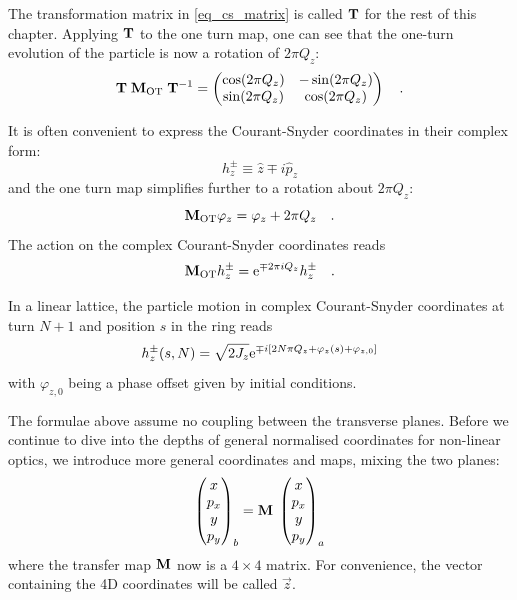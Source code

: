 The transformation matrix in \eqref{eq_cs_matrix} is called $\mathbf{T}$ for the rest of this chapter.
Applying $\mathbf{T}$ to the one turn map, one can see that the one-turn evolution of the particle is
now a rotation of $2\pi Q_z$:
\begin{equation}
    \mathbf{T}\;\mathbf{M}_\text{OT}\;\mathbf{T}^{-1} = 
    \begin{pmatrix}
        \cos(2\pi Q_z) & -\sin(2\pi Q_z)\\
        \sin(2\pi Q_z) & \cos(2\pi Q_z) \\
    \end{pmatrix}
    \quad .
\end{equation}

It is often convenient to express the Courant-Snyder coordinates in their complex form:
%
\begin{equation}
    h^\pm_z \equiv \hat{z} \mp i \hat{p}_z
    \label{eq_courantsnyder}
\end{equation}
%
and the one turn map simplifies further to a rotation about $2\pi Q_z$:
%
\begin{equation}
    \mathbf{M}_\text{OT} \varphi_z = \varphi_z + 2\pi Q_z
    \quad .
\end{equation}
%
The action on the complex Courant-Snyder coordinates reads
%
\begin{equation}
  \mathbf{M}_{\text{OT}} h_z^\pm = \text{e}^{\mp 2\pi i Q_z}h_z^\pm
  \quad .
\end{equation}

In a linear lattice, the particle motion in complex Courant-Snyder coordinates at turn $N+1$ and position
$s$ in the ring reads
%
\begin{equation}
    h_z^\pm(s,N) = \sqrt{2J_z} \text{e}^{\mp i \left[2N\pi Q_z + \varphi_z(s) + \varphi_{z,0}\right]}
\end{equation}
%
with $\varphi_{z,0}$ being a phase offset given by initial conditions.

The formulae above assume no coupling between the transverse planes.
Before we continue to dive into the depths of general normalised coordinates for non-linear
optics, we introduce more general coordinates and maps, mixing the two planes:
\begin{equation}
    \begin{pmatrix}
        x \\ p_x \\ y \\ p_y
    \end{pmatrix}_b
    =
    \mathbf{M}\;
    \begin{pmatrix}
        x \\ p_x \\ y \\ p_y
    \end{pmatrix}_a
\end{equation}
where the transfer map $\mathbf{M}$ now is a $4\times 4$ matrix.
For convenience, the vector containing the 4D coordinates will be called $\vec{z}$.

